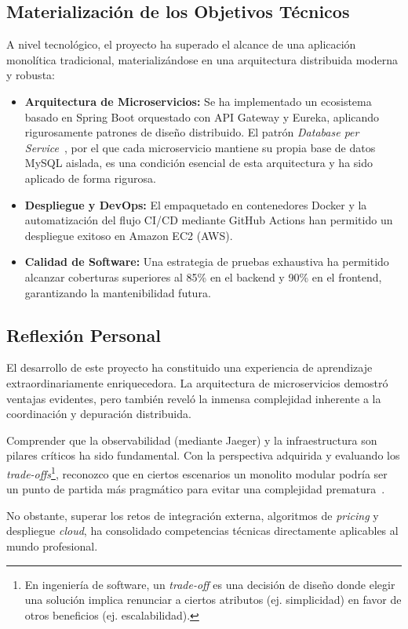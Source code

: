 \subsection{Materialización de los Objetivos Técnicos}
A nivel tecnológico, el proyecto ha superado el alcance de una aplicación monolítica tradicional, materializándose en una arquitectura distribuida moderna y robusta:
\begin{itemize}
    \item \textbf{Arquitectura de Microservicios:} Se ha implementado un ecosistema basado en Spring Boot orquestado con API Gateway y Eureka, aplicando rigurosamente patrones de diseño distribuido. El patrón \textit{Database per Service}~\cite[Cap.~5]{richardson2018}, por el que cada microservicio mantiene su propia base de datos MySQL aislada, es una condición esencial de esta arquitectura y ha sido aplicado de forma rigurosa.
    \item \textbf{Despliegue y DevOps:} El empaquetado en contenedores Docker y la automatización del flujo CI/CD mediante GitHub Actions han permitido un despliegue exitoso en Amazon EC2 (AWS).
    \item \textbf{Calidad de Software:} Una estrategia de pruebas exhaustiva ha permitido alcanzar coberturas superiores al 85\% en el backend y 90\% en el frontend, garantizando la mantenibilidad futura.
\end{itemize}

\subsection{Reflexión Personal}
El desarrollo de este proyecto ha constituido una experiencia de aprendizaje extraordinariamente enriquecedora. La arquitectura de microservicios demostró ventajas evidentes, pero también reveló la inmensa complejidad inherente a la coordinación y depuración distribuida. 

Comprender que la observabilidad (mediante Jaeger) y la infraestructura son pilares críticos ha sido fundamental. Con la perspectiva adquirida y evaluando los \textit{trade-offs}\footnote{En ingeniería de software, un \textit{trade-off} es una decisión de diseño donde elegir una solución implica renunciar a ciertos atributos (ej. simplicidad) en favor de otros beneficios (ej. escalabilidad).}, reconozco que en ciertos escenarios un monolito modular podría ser un punto de partida más pragmático para evitar una complejidad prematura~\cite{newman2015}. 

No obstante, superar los retos de integración externa, algoritmos de \textit{pricing} y despliegue \textit{cloud}, ha consolidado competencias técnicas directamente aplicables al mundo profesional.


